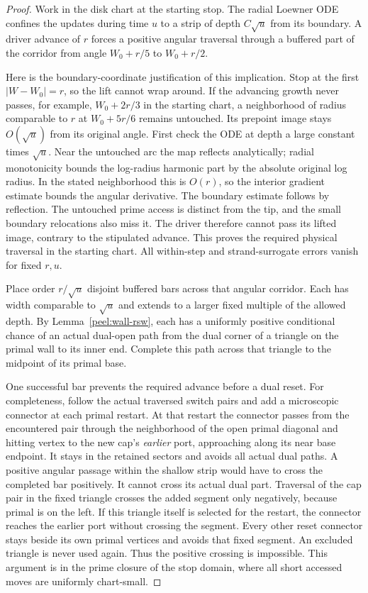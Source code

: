 \begin{proof}
Work in the disk chart at the starting stop.  The radial Loewner ODE
confines the updates during time $u$ to a strip of depth $C\sqrt u$
from its boundary.  A driver advance of $r$ forces a positive angular
traversal through a buffered part of the corridor from angle
$W_0+r/5$ to $W_0+r/2$.

Here is the boundary-coordinate justification of this implication.
Stop at the first $|W-W_0|=r$, so the lift cannot wrap around.
If the advancing growth never passes, for example,
$W_0+2r/3$ in the starting chart, a neighborhood of radius comparable
to $r$ at $W_0+5r/6$ remains untouched.  Its prepoint image stays
$O(\sqrt u)$ from its original angle.  First check the ODE at depth
a large constant times $\sqrt u$.  Near the untouched arc the map
reflects analytically; radial monotonicity bounds the log-radius
harmonic part by the absolute original log radius.  In the stated
neighborhood this is $O(r)$, so the interior gradient estimate bounds
the angular derivative.  The boundary estimate follows by reflection.
The untouched prime access is distinct from the tip, and the small
boundary relocations also miss it.  The driver therefore cannot pass
its lifted image, contrary to the stipulated advance.  This proves the
required physical traversal in the starting chart.  All within-step
and strand-surrogate errors vanish for fixed $r,u$.

Place order $r/\sqrt u$ disjoint buffered bars across that angular
corridor.  Each has width comparable to $\sqrt u$ and extends to a
larger fixed multiple of the allowed depth.  By
Lemma~\ref{peel:wall-rsw}, each has a uniformly positive conditional
chance of an actual dual-open path from the dual corner of a triangle
on the primal wall to its inner end.  Complete this path across that
triangle to the midpoint of its primal base.

One successful bar prevents the required advance before a dual reset.
For completeness, follow the actual traversed switch pairs and add a
microscopic connector at each primal restart.  At that restart the
connector passes from the encountered pair through the neighborhood
of the open primal diagonal and hitting vertex to the new cap's
\emph{earlier} port, approaching along its near base endpoint.  It
stays in the retained sectors and avoids all actual dual paths.
A positive angular passage within the shallow strip would have to
cross the completed bar positively.  It cannot cross its actual dual
part.  Traversal of the cap pair in the fixed triangle crosses the
added segment only negatively, because primal is on the left.  If
this triangle itself is selected for the restart, the connector reaches
the earlier port without crossing the segment.  Every other reset
connector stays beside its own primal vertices and avoids that fixed
segment.  An excluded triangle is never used again.  Thus the positive
crossing is impossible.  This argument is in the prime closure of the
stop domain, where all short accessed moves are uniformly chart-small.


\end{proof}
